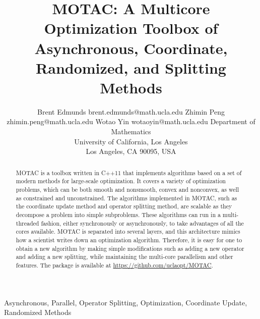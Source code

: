 \documentclass[twoside,11pt]{article}
\newcommand{\pkg}{{MOTAC}}
\newcommand{\repo}{\url{https://github.com/uclaopt/MOTAC}}
\begin{document}
\title{\pkg: A Multicore Optimization Toolbox of Asynchronous, Coordinate, Randomized, and Splitting Methods}

\author{\name Brent Edmunds \email brent.edmunds@math.ucla.edu
       \AND
       \name Zhimin Peng \email zhimin.peng@math.ucla.edu
       \AND
        \name Wotao Yin \email wotaoyin@math.ucla.edu 
       \AND
       \addr Department of Mathematics\\
       University of California, Los Angeles\\
       Los Angeles, CA 90095, USA}

\maketitle

\begin{abstract}
MOTAC is a toolbox written in C++11 that implements algorithms based on a set of modern methods for large-scale optimization. It covers a variety of optimization problems, which can be both smooth and nonsmooth, convex and nonconvex, as well as constrained and unconstrained. The algorithms implemented in MOTAC, such as the coordinate update method and operator splitting method, are scalable as they decompose a problem into simple subproblems. These algorithms can run in a multi-threaded fashion, either synchronously or asynchronously, to take advantages of all the cores available. MOTAC is separated into several layers, and this architecture mimics how a scientist writes down an optimization algorithm. Therefore, it is easy for one to obtain a new algorithm by making simple modifications such as adding a new operator and adding a new splitting, while maintaining the multi-core parallelism and other features. The package is available at \repo.
\end{abstract}

\begin{keywords}
Asynchronous, Parallel, Operator Splitting, Optimization, Coordinate Update, Randomized Methods
\end{keywords}








% 

%

%

%


% 


% 

% 

% 





\end{document}
